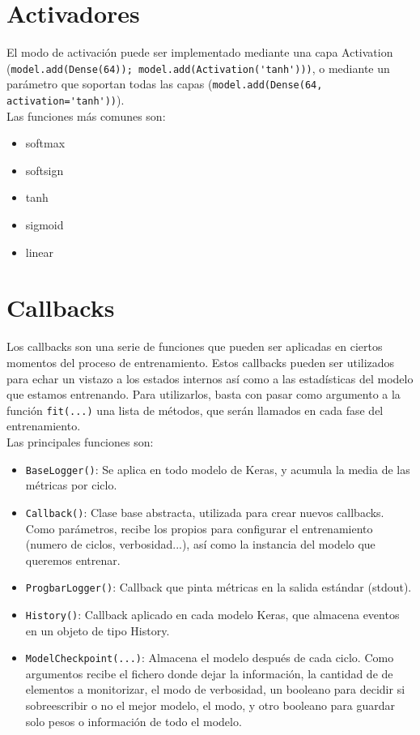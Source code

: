 \section{Activadores}
El modo de activación puede ser implementado mediante una capa Activation (\lstinline{model.add(Dense(64)); model.add(Activation('tanh')))}, o mediante un parámetro que soportan todas las capas (\lstinline{model.add(Dense(64, activation='tanh'))}).\\
Las funciones más comunes son:
\begin{itemize}[noitemsep]
\item softmax
\item softsign
\item tanh
\item sigmoid
\item linear
\end{itemize}
\section{Callbacks}
Los callbacks son una serie de funciones que pueden ser aplicadas en ciertos momentos del proceso de entrenamiento. Estos callbacks pueden ser utilizados para echar un vistazo a los estados internos así como a las estadísticas del modelo que estamos entrenando. Para utilizarlos, basta con pasar como argumento a la función \lstinline{fit(...)} una lista de métodos, que serán llamados en cada fase del entrenamiento.\\
Las principales funciones son:
\begin{itemize}
\item \lstinline{BaseLogger()}: Se aplica en todo modelo de Keras, y acumula la media de las métricas por ciclo.
\item \lstinline{Callback()}: Clase base abstracta, utilizada para crear nuevos callbacks. Como parámetros, recibe los propios para configurar el entrenamiento (numero de ciclos, verbosidad...), así como la instancia del modelo que queremos entrenar.
\item \lstinline{ProgbarLogger()}: Callback que pinta métricas en la salida estándar (stdout).
\item \lstinline{History()}: Callback aplicado en cada modelo Keras, que almacena eventos en un objeto de tipo History.
\item \lstinline{ModelCheckpoint(...)}: Almacena el modelo después de cada ciclo. Como argumentos recibe el fichero donde dejar la información, la cantidad de de elementos a monitorizar, el modo de verbosidad, un booleano para decidir si sobreescribir o no el mejor modelo, el modo, y otro booleano para guardar solo pesos o información de todo el modelo.
\end{itemize}
